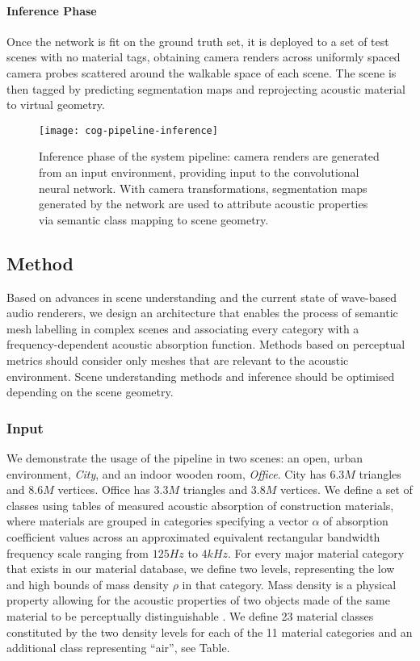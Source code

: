 \paragraph{Inference Phase}
Once the network is fit on the ground truth set, it is deployed to a set of test scenes with no material tags, obtaining camera renders across uniformly spaced camera probes scattered around the walkable space of each scene. The scene is then tagged by predicting segmentation maps and reprojecting acoustic material to virtual geometry.
\begin{figure}[htbp]
    \centering
    \texttt{[image: cog-pipeline-inference]}
    \caption{Inference phase of the system pipeline: camera renders are generated from an input environment, providing input to the convolutional neural network. With camera transformations, segmentation maps generated by the network are used to attribute acoustic properties via semantic class mapping to scene geometry.}
    \label{fig:cog-inference}
\end{figure}



\subsection{Method}
\label{sec:mat-method}
Based on advances in scene understanding and the current state of wave-based audio renderers, we design an architecture that enables the process of semantic mesh labelling in complex scenes and associating every category with a frequency-dependent acoustic absorption function. Methods based on perceptual metrics should consider only meshes that are relevant to the acoustic environment. Scene understanding methods and inference should be optimised depending on the scene geometry.

\subsubsection{Input}
We demonstrate the usage of the pipeline in two scenes: an open, urban environment, \emph{City}, and an indoor wooden room, \emph{Office}. City has $6.3M$ triangles and $8.6M$ vertices. Office has $3.3M$ triangles and $3.8M$ vertices. 
We define a set of classes using tables of measured acoustic absorption of construction materials, where materials are grouped in categories specifying a vector $\alpha$ of absorption coefficient values across an approximated equivalent rectangular bandwidth frequency scale ranging from $125Hz$ to $4kHz$. For every major material category that exists in our material database, we define two levels, representing the low and high bounds of mass density $\rho$ in that category. Mass density is a physical property allowing for the acoustic properties of two objects made of the same material to be perceptually distinguishable \cite{giordano2006material}. 
We define 23 material classes constituted by the two density levels for each of the 11 material categories and an additional class representing ``air'', see Table.

